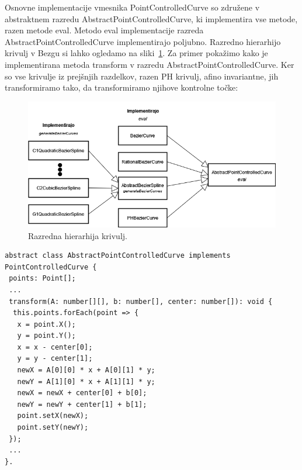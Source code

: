 \documentclass[isrm2, tisk]{fmfdelo}
\begin{document}
    Osnovne implementacije vmesnika PointControlledCurve so združene v abstraktnem razredu AbstractPointControlledCurve, ki implementira vse metode, razen metode eval\@.
    Metodo eval implementacije razreda AbstractPointControlledCurve implementirajo poljubno.
    Razredno hierarhijo krivulj v Bezgu si lahko ogledamo na sliki~\ref{fig:hiearhija-krivulj}.
    Za primer pokažimo kako je implementirana metoda transform v razredu AbstractPointControlledCurve.
    Ker so vse krivulje iz prejšnjih razdelkov, razen PH krivulj, afino invariantne, jih transformiramo tako, da transformiramo njihove kontrolne točke:
    \begin{figure}[h!]
        \centering
        \includegraphics[width = \textwidth]{drawio/curve-class-hierarchy.drawio}
        \caption{Razredna hierarhija krivulj.}
        \label{fig:hiearhija-krivulj}
    \end{figure}
    \begin{lstlisting}[label={lst:affine-transform}]
abstract class AbstractPointControlledCurve implements PointControlledCurve {
 points: Point[];
 ...
 transform(A: number[][], b: number[], center: number[]): void {
  this.points.forEach(point => {
   x = point.X();
   y = point.Y();
   x = x - center[0];
   y = y - center[1];
   newX = A[0][0] * x + A[0][1] * y;
   newY = A[1][0] * x + A[1][1] * y;
   newX = newX + center[0] + b[0];
   newY = newY + center[1] + b[1];
   point.setX(newX);
   point.setY(newY);
 });
 ...
}.
    \end{lstlisting}
\end{document}
